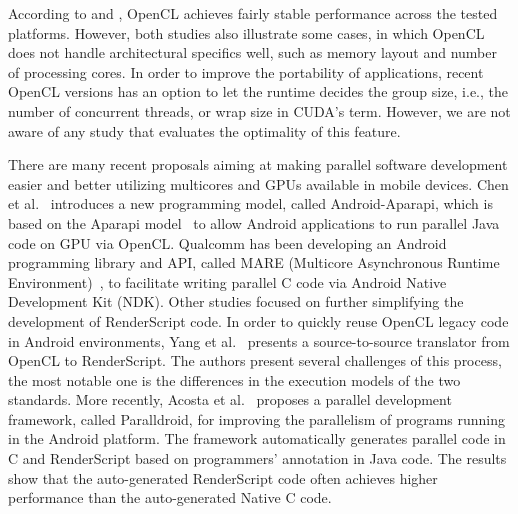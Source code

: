 According to \cite{komatsu2010evaluating} and \cite{dolbeau2013one}, OpenCL
achieves fairly stable performance across the tested platforms. However, both
studies also illustrate some cases, in which OpenCL does not handle
architectural specifics well, such as memory layout and number of processing
cores. In order to improve the portability of applications, recent OpenCL
versions has an option to let the runtime decides the group size, i.e., the
number of concurrent threads, or wrap size in CUDA's term. However, we are not
aware of any study that evaluates the optimality of this feature.


There are many recent proposals aiming at making parallel software development
easier and better utilizing multicores and GPUs available in
mobile devices. Chen et al.~\cite{6704508} introduces a new programming model,
called Android-Aparapi, which is based on the Aparapi model~\cite{Aparapi_web}
to allow Android applications to run parallel Java code on GPU via OpenCL.
Qualcomm has been developing an Android programming library and API, called
MARE (Multicore Asynchronous Runtime Environment)~\cite{MARE_qc}, to facilitate writing parallel
C code via Android Native Development Kit (NDK).
Other studies focused on further simplifying the development of RenderScript
code. In order to quickly reuse OpenCL legacy code in Android environments, Yang
et al.~\cite{yang2012o2render} presents a source-to-source translator from
OpenCL to RenderScript. The authors present several challenges of this process,
the most notable one is the differences in the execution models of the two
standards. More recently, Acosta et al.~\cite{alejandro2014performance}
proposes a parallel development framework, called Paralldroid, for improving the
parallelism of programs running in the Android platform. The framework
automatically generates parallel code in C and RenderScript based on
programmers' annotation in Java code. The results show that the auto-generated
RenderScript code often achieves higher performance than the auto-generated
Native C code.

